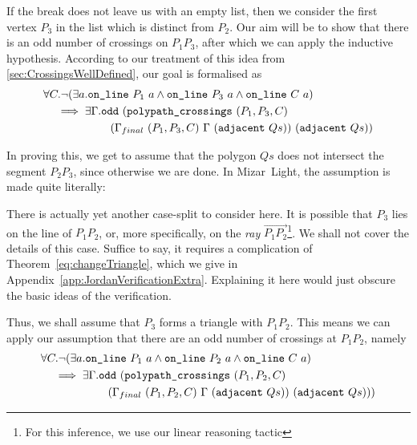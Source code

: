If the break does not leave us with an empty list, then we consider the first vertex $P_3$ in the list which is distinct from $P_2$. Our aim will be to show that there is an odd number of crossings on $P_1P_3$, after which we can apply the inductive hypothesis. According to our treatment of this idea from \ref{sec:CrossingsWellDefined}, our goal is formalised as
\begin{equation*}
  \begin{aligned}
    &\forall C. \neg(\exists a.\texttt{on\_line}\ P_1\ a\wedge \texttt{on\_line}\ P_3\ a\wedge \texttt{on\_line}\ C\ a)\\
    &\quad \implies \exists \Gamma. \texttt{odd}\ (\texttt{polypath\_crossings}\ (P_1,P_3,C)\\
    &\qquad\qquad\qquad(\Gamma_{final}\ (P_1,P_3,C)\ \Gamma\ (\texttt{adjacent}\ Qs))\ (\texttt{adjacent}\ Qs))
  \end{aligned}
\end{equation*}

In proving this, we get to assume that the polygon $Qs$ does not intersect the segment $P_2P_3$, since otherwise we are done. In Mizar~Light, the assumption is made quite literally:

\begin{center}\end{center}

There is actually yet another case-split to consider here. It is possible that $P_3$ lies on the line of $P_1P_2$, or, more specifically, on the \emph{ray} $\overrightarrow{P_1P_2}$\footnote{For this inference, we use our linear reasoning tactic}. We shall not cover the details of this case. Suffice to say, it requires a complication of Theorem~\ref{eq:changeTriangle}, which we give in Appendix~\ref{app:JordanVerificationExtra}. Explaining it here would just obscure the basic ideas of the verification.

Thus, we shall assume that $P_3$ forms a triangle with $P_1P_2$. This means we can apply our assumption that there are an odd number of crossings at $P_1P_2$, namely
\begin{align*}&\forall C. \neg(\exists a.\texttt{on\_line}\ P_1\ a\wedge \texttt{on\_line}\ P_2\ a\wedge \texttt{on\_line}\ C\ a)\\
    &\quad\implies \exists \Gamma. \texttt{odd}\ (\texttt{polypath\_crossings}\ (P_1,P_2,C)\\
    &\qquad\qquad\qquad(\Gamma_{final}\ (P_1,P_2,C)\ \Gamma\ (\texttt{adjacent}\ Qs))\ (\texttt{adjacent}\ Qs)))
\end{align*}

